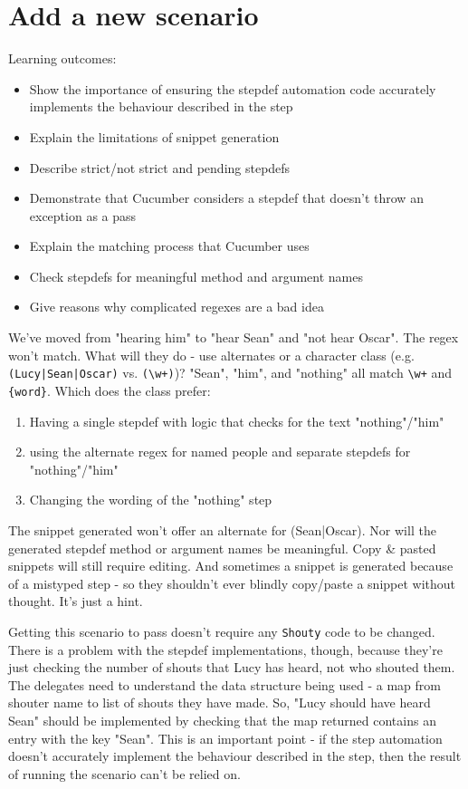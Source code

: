 \chapter*{Add a new scenario}

\ifnotes

    Learning outcomes:
    
    \begin{itemize}
        \item Show the importance of ensuring the stepdef automation code accurately implements the behaviour described in the step
        \item Explain the limitations of snippet generation
        \item Describe strict/not strict and pending stepdefs
        \item Demonstrate that Cucumber considers a stepdef that doesn't throw an exception as a pass
        \item Explain the matching process that Cucumber uses
        \item Check stepdefs for meaningful method and argument names
        \item Give reasons why complicated regexes are a bad idea
    \end{itemize}

    We've moved from "hearing him" to "hear Sean" and "not hear Oscar". The regex won't match. What will they do - use alternates or a character class (e.g. \texttt{(Lucy|Sean|Oscar)} vs. \texttt{(\textbackslash w+)})? "Sean", "him", and "nothing" all match \texttt{\textbackslash w+} and \texttt{\{word\}}. Which does the class prefer:
    \begin{enumerate}
        \item Having a single stepdef with logic that checks for the text "nothing"/"him"
        \item using the alternate regex for named people and separate stepdefs for "nothing"/"him"
        \item Changing the wording of the "nothing" step
    \end{enumerate}

    The snippet generated won't offer an alternate for (Sean|Oscar). Nor will the generated stepdef method or argument names be meaningful. Copy \& pasted snippets will still require editing. And sometimes a snippet is generated because of a mistyped step - so they shouldn't ever blindly copy/paste a snippet without thought. It's just a hint.
    
    Getting this scenario to pass doesn't require any \texttt{Shouty} code to be changed. There is a problem with the stepdef implementations, though, because they're just checking the number of shouts that Lucy has heard, not who shouted them. The delegates need to understand the data structure being used - a map from shouter name to list of shouts they have made. So, "Lucy should have heard Sean" should be implemented by checking that the map returned contains an entry with the key "Sean". This is an important point - if the step automation doesn't accurately implement the behaviour described in the step, then the result of running the scenario can't be relied on.
    

